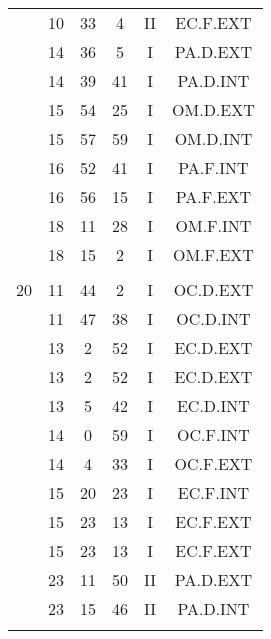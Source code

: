 \documentclass[12pt, a4paper]{article}
\begin{document}
\begin{multicols}{3}
{\begin{tabular}{c c c c c c}
	 	 	 	 & 10 & 33 & 4 & II & EC.F.EXT\\%
	 	 	 	 & 14 & 36 & 5 & I & PA.D.EXT\\%
	 	 	 	 & 14 & 39 & 41 & I & PA.D.INT\\%
	 	 	 	 & 15 & 54 & 25 & I & OM.D.EXT\\%
	 	 	 	 & 15 & 57 & 59 & I & OM.D.INT\\%
	 	 	 	 & 16 & 52 & 41 & I & PA.F.INT\\%
	 	 	 	 & 16 & 56 & 15 & I & PA.F.EXT\\%
	 	 	 	 & 18 & 11 & 28 & I & OM.F.INT\\%
	 	 	 	 & 18 & 15 & 2 & I & OM.F.EXT\\%
	 	 	 	 & & & & & \\%
	 	 	 	20 & 11 & 44 & 2 & I & OC.D.EXT\\%
	 	 	 	 & 11 & 47 & 38 & I & OC.D.INT\\%
	 	 	 	 & 13 & 2 & 52 & I & EC.D.EXT\\%
	 	 	 	 & 13 & 2 & 52 & I & EC.D.EXT\\%
	 	 	 	 & 13 & 5 & 42 & I & EC.D.INT\\%
	 	 	 	 & 14 & 0 & 59 & I & OC.F.INT\\%
	 	 	 	 & 14 & 4 & 33 & I & OC.F.EXT\\%
	 	 	 	 & 15 & 20 & 23 & I & EC.F.INT\\%
	 	 	 	 & 15 & 23 & 13 & I & EC.F.EXT\\%
	 	 	 	 & 15 & 23 & 13 & I & EC.F.EXT\\%
	 	 	 	 & 23 & 11 & 50 & II & PA.D.EXT\\%
	 	 	 	 & 23 & 15 & 46 & II & PA.D.INT\\%
	 	 	 	 & & & & & \\%

\end{tabular}}
\end{multicols}
\end{document}
